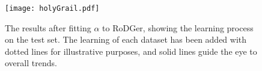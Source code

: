 \begin{figure}[H]
    \begin{center}
        \texttt{[image: holyGrail.pdf]}
        \caption[RoDGer Test Results]{The results after fitting $\alpha{}$ to RoDGer, showing the learning process on the test set. The learning of each dataset has been added with dotted lines for illustrative purposes, and solid lines guide the eye to overall trends.}
        \label{fig:holyTrinity}
    \end{center}
\end{figure}

